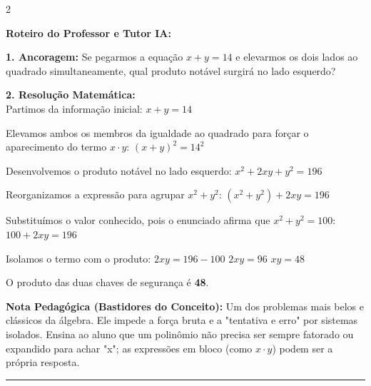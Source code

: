 \begin{multicols*}{2}
\ifgabarito
    \begin{tcolorbox}[colback=CorTitUm!5, colframe=CorTitUm, boxrule=1pt, arc=4pt, left=6pt, right=6pt, top=6pt, bottom=6pt]
    \small\textbf{\textcolor{CorTitUm}{Roteiro do Professor e Tutor IA:}}\par\vspace{0.1cm}
    \color{CinzaEscuro}
    \textbf{1. Ancoragem:} Se pegarmos a equação $ x + y = 14 $ e elevarmos os dois lados ao quadrado simultaneamente, qual produto notável surgirá no lado esquerdo?\par\vspace{0.1cm}
    \textbf{2. Resolução Matemática:}\\
    Partimos da informação inicial:
    $ x + y = 14 $
    
    Elevamos ambos os membros da igualdade ao quadrado para forçar o aparecimento do termo $ x \cdot y $:
    $ (x + y)^2 = 14^2 $
    
    Desenvolvemos o produto notável no lado esquerdo:
    $ x^2 + 2xy + y^2 = 196 $
    
    Reorganizamos a expressão para agrupar $ x^2 + y^2 $:
    $ (x^2 + y^2) + 2xy = 196 $
    
    Substituímos o valor conhecido, pois o enunciado afirma que $ x^2 + y^2 = 100 $:
    $ 100 + 2xy = 196 $
    
    Isolamos o termo com o produto:
    $ 2xy = 196 - 100 $
    $ 2xy = 96 $
    $ xy = 48 $
    
    O produto das duas chaves de segurança é \textbf{48}.
    \end{tcolorbox}
    \vspace{0.15cm}
    
    \begin{boxexplicacao}
    \textbf{Nota Pedagógica (Bastidores do Conceito):} Um dos problemas mais belos e clássicos da álgebra. Ele impede a força bruta e a "tentativa e erro" por sistemas isolados. Ensina ao aluno que um polinômio não precisa ser sempre fatorado ou expandido para achar "x"; as expressões em bloco (como $x \cdot y$) podem ser a própria resposta.
    \end{boxexplicacao}
\fi

\par\vspace{\espacoQuestao}

\noindent\textcolor{CorLinha}{\rule{\linewidth}{0.5pt}} 
\par\vspace{\espacoPreQuestao}

\end{multicols*}
